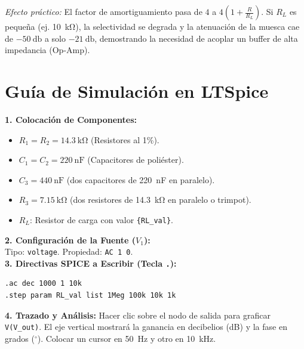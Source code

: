 \documentclass[11pt,a4paper,twoside]{article}
\newcommand{\tecla}[1]{\colorbox{gray!20}{\texttt{\footnotesize\textbf{#1}}}}
\newcommand{\spice}[1]{\texttt{\color{purple}#1}}
\begin{document}
\textit{Efecto práctico:} El factor de amortiguamiento pasa de $4$ a $4\left(1 + \frac{R}{R_L}\right)$. Si $R_L$ es pequeña (ej. \qty{10}{\kilo\ohm}), la selectividad se degrada y la atenuación de la muesca cae de $\qty{-50}{\decibel}$ a solo $\qty{-21}{\decibel}$, demostrando la necesidad de acoplar un buffer de alta impedancia (Op-Amp).

\newpage
\section{Guía de Simulación en LTSpice}
\begin{spicecmd}
\textbf{1. Colocación de Componentes:}
\begin{itemize}[itemsep=1pt]
    \item $R_1 = R_2 = \qty{14.3}{\kilo\ohm}$ (Resistores al 1\%).
    \item $C_1 = C_2 = \qty{220}{\nano\farad}$ (Capacitores de poliéster).
    \item $C_3 = \qty{440}{\nano\farad}$ (dos capacitores de \qty{220}{\nano\farad} en paralelo).
    \item $R_3 = \qty{7.15}{\kilo\ohm}$ (dos resistores de \qty{14.3}{\kilo\ohm} en paralelo o trimpot).
    \item $R_L$: Resistor de carga con valor \spice{\{RL\_val\}}.
\end{itemize}
\textbf{2. Configuración de la Fuente ($V_1$):}\\
Tipo: \texttt{voltage}. Propiedad: \spice{AC 1 0}.\\

\textbf{3. Directivas SPICE a Escribir (Tecla \tecla{.}):}
\begin{lstlisting}[language=SPICE, numbers=none]
.ac dec 1000 1 10k
.step param RL_val list 1Meg 100k 10k 1k
\end{lstlisting}

\textbf{4. Trazado y Análisis:}
Hacer clic sobre el nodo de salida para graficar \spice{V(V\_out)}. El eje vertical mostrará la ganancia en decibelios (dB) y la fase en grados ($^\circ$). Colocar un cursor en \qty{50}{\hertz} y otro en \qty{10}{\kilo\hertz}.
\end{spicecmd}
\end{document}
